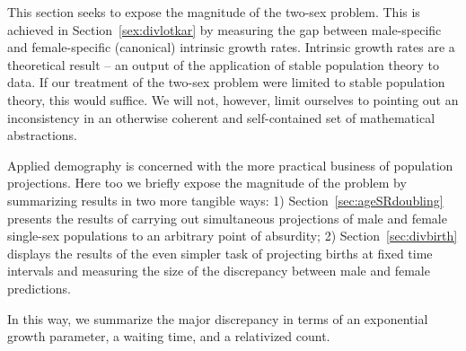 
This section seeks to expose the magnitude of the two-sex problem. This is
achieved in Section~\ref{sex:divlotkar} by measuring the gap between
male-specific and female-specific (canonical) intrinsic growth rates. Intrinsic growth rates are a
theoretical result -- an output of the application of stable population 
theory to data. If our treatment of the two-sex problem were limited to 
stable population theory, this would suffice. We will not, however, limit
ourselves to pointing out an inconsistency in an otherwise coherent and
self-contained set of mathematical abstractions. 

Applied demography is concerned with the more practical
business of population projections. Here too we briefly
expose the magnitude of the problem by summarizing results in two more tangible
ways: 1) Section~\ref{sec:ageSRdoubling} presents the results of carrying out
simultaneous projections of male and female single-sex populations to an 
arbitrary point of absurdity; 2) Section~\ref{sec:divbirth} displays the
results of the even simpler task of projecting births at fixed time intervals
and measuring the size of the discrepancy between male and female predictions.

In this way, we summarize the major discrepancy in terms of an exponential
growth parameter, a waiting time, and a relativized count.

